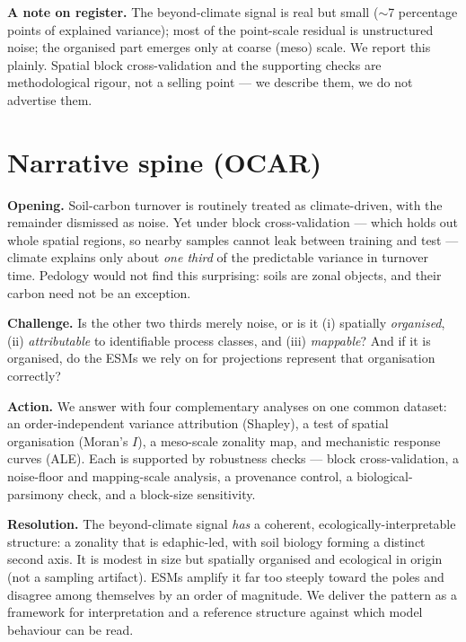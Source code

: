 \documentclass[11pt]{article}
\begin{document}
\textbf{A note on register.} The beyond-climate signal is real but small
($\sim$7 percentage points of explained variance); most of the point-scale residual
is unstructured noise; the organised part emerges only at coarse (meso) scale. We
report this plainly. Spatial block cross-validation and the supporting checks are
methodological rigour, not a selling point --- we describe them, we do not advertise
them.

\section{Narrative spine (OCAR)}

\textbf{Opening.} Soil-carbon turnover is routinely treated as climate-driven, with
the remainder dismissed as noise. Yet under block cross-validation --- which holds
out whole spatial regions, so nearby samples cannot leak between training and test
--- climate explains only about \emph{one third} of the predictable variance in
turnover time. Pedology would not find this surprising: soils are zonal objects, and
their carbon need not be an exception.

\textbf{Challenge.} Is the other two thirds merely noise, or is it (i) spatially
\emph{organised}, (ii) \emph{attributable} to identifiable process classes, and
(iii) \emph{mappable}? And if it is organised, do the ESMs we rely on for
projections represent that organisation correctly?

\textbf{Action.} We answer with four complementary analyses on one common dataset:
an order-independent variance attribution (Shapley), a test of spatial organisation
(Moran's $I$), a meso-scale zonality map, and mechanistic response curves (ALE).
Each is supported by robustness checks --- block cross-validation, a noise-floor and
mapping-scale analysis, a provenance control, a biological-parsimony check, and a
block-size sensitivity.

\textbf{Resolution.} The beyond-climate signal \emph{has} a coherent,
ecologically-interpretable structure: a zonality that is edaphic-led, with soil
biology forming a distinct second axis. It is modest in size but spatially organised
and ecological in origin (not a sampling artifact). ESMs amplify it far too steeply
toward the poles and disagree among themselves by an order of magnitude. We deliver
the pattern as a framework for interpretation and a reference structure against which
model behaviour can be read.
\end{document}
